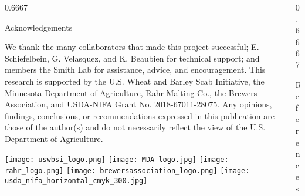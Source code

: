 \documentclass[final]{beamer}
\newlength{\onecolwid}
\newlength{\twocolwid}
\begin{document}
\begin{frame}[t]
\begin{columns}[t]
\begin{column}{\twocolwid}
\begin{columns}[t,totalwidth=\twocolwid]
\begin{column}{0.6667\onecolwid}
\begin{block}{\large{Acknowledgements}}
\begin{tiny}

We thank the many collaborators that made this project successful; E. Schiefelbein, G. Velasquez, and K. Beaubien for technical support; and members the Smith Lab for assistance, advice, and encouragement. This research is supported by the U.S. Wheat and Barley Scab Initiative, the Minnesota Department of Agriculture, Rahr Malting Co., the Brewers Association, and USDA-NIFA Grant No. 2018-67011-28075. Any opinions, findings, conclusions, or recommendations expressed in this publication are those of the author(s) and do not necessarily reflect the view of the U.S. Department of Agriculture.

\vspace{0.25cm}

\graphicspath{{C:/Users/jln54/GoogleDrive/BarleyLab/ForKevin/Resources/}}


\begin{center}
\texttt{[image: uswbsi\_logo.png]}
\hspace{.0cm}
\texttt{[image: MDA-logo.jpg]}
\hspace{.0cm}
\texttt{[image: rahr\_logo.png]}
\hspace{.0cm}
\texttt{[image: brewersassociation\_logo.png]}
\hspace{0.0cm}
\texttt{[image: usda\_nifa\_horizontal\_cmyk\_300.jpg]}
\end{center}

\end{tiny}

\end{block}

\end{column}



\begin{column}{0.6667\onecolwid} %


\begin{block}{\large{References}}


\end{block}
\end{column}
\end{columns}
\end{column}
\end{columns}
\end{frame}
\end{document}
